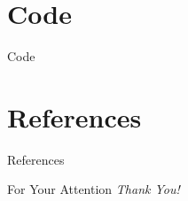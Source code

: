 \documentclass{beamer}
\begin{document}
\section{Code}

\begin{frame}[allowframebreaks]{Code}
	
\end{frame}

\section{References}
\begin{frame}[allowframebreaks]{References}
    \printbibliography
\end{frame}

\begin{frame}{For Your Attention}
    \centering
    \Large
    \emph{Thank You!}
\end{frame}
\end{document}
